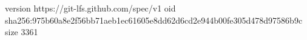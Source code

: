 version https://git-lfs.github.com/spec/v1
oid sha256:975b60a8e2f56bb71aeb1ec61605e8dd62d6cd2e944b00fe305d478d97586b9c
size 3361
